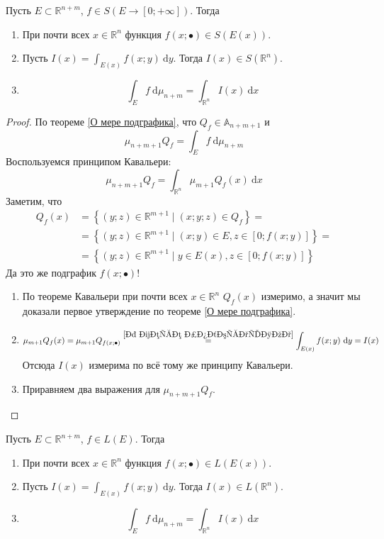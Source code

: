 \documentclass{article}
\begin{document}
    \begin{theorem}
        \label{Теорема Тонелли}
        Пусть $E\subset\mathbb R^{n+m}$, $f\in S(E\to[0;+\infty])$. Тогда
        \begin{enumerate}
            \item При почти всех $x\in\mathbb R^n$ функция $f(x;\bullet)\in S(E(x))$.
            \item Пусть $I(x)=\int_{E(x)}f(x;y)~\mathrm dy$. Тогда $I(x)\in S(\mathbb R^n)$.
            \item
            $$\int_E f~\mathrm d\mu_{n+m}=\int_{\mathbb R^n}I(x)~\mathrm dx$$
        \end{enumerate}
    \end{theorem}
    \begin{proof}
        По теореме \ref{О мере подграфика}, что $Q_f\in\mathbb A_{n+m+1}$ и
        $$
        \mu_{n+m+1}Q_f=\int_E f~\mathrm d\mu_{n+m}
        $$
        Воспользуемся принципом Кавальери:
        $$
        \mu_{n+m+1}Q_f=\int_{\mathbb R^n}\mu_{m+1}Q_f(x)~\mathrm dx
        $$
        Заметим, что
        \[\begin{split}
            Q_f(x)&=\left\{(y;z)\in\mathbb R^{m+1}\mid (x;y;z)\in Q_f\right\}=\\
            &=\left\{(y;z)\in\mathbb R^{m+1}\mid (x;y)\in E,z\in[0;f(x;y)]\right\}=\\
            &=\left\{(y;z)\in\mathbb R^{m+1}\mid y\in E(x),z\in[0;f(x;y)]\right\}
        \end{split}\]
        Да это же подграфик $f(x;\bullet)$!
        \begin{enumerate}
            \item По теореме Кавальери при почти всех $x\in\mathbb R^n$ $Q_f(x)$ измеримо, а значит мы доказали первое утверждение по теореме \ref{О мере подграфика}.
            \item
            $$
            \mu_{m+1}Q_f(x)=\mu_{m+1}Q_{f(x;\bullet)}\overset{\ref{О мере подграфика}}=\int_{E(x)}f(x;y)~\mathrm dy=I(x)
            $$
            Отсюда $I(x)$ измерима по всё тому же принципу Кавальери.
            \item Приравняем два выражения для $\mu_{n+m+1}Q_f$.
        \end{enumerate}
    \end{proof}
    \begin{theorem}
        \label{Теорема Фубини}
        \label{Выражение кратного интеграла через повторный}
        Пусть $E\subset\mathbb R^{n+m}$, $f\in L(E)$. Тогда
        \begin{enumerate}
            \item При почти всех $x\in\mathbb R^n$ функция $f(x;\bullet)\in L(E(x))$.
            \item Пусть $I(x)=\int_{E(x)}f(x;y)~\mathrm dy$. Тогда $I(x)\in L(\mathbb R^n)$.
            \item
            $$\int_E f~\mathrm d\mu_{n+m}=\int_{\mathbb R^n}I(x)~\mathrm dx$$
        \end{enumerate}
    \end{theorem}
\end{document}
